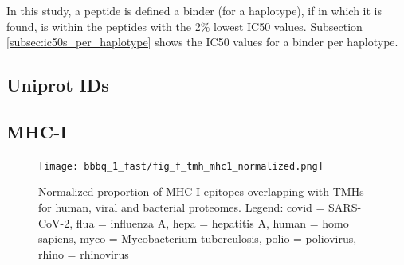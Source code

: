 In this study, a peptide is defined a binder (for a haplotype), 
if  in which it is found, 
is within the peptides with the 2\% lowest IC50 values.
Subsection \ref{subsec:ic50s_per_haplotype} shows the IC50 values
for a binder per haplotype.

\subsection{Uniprot IDs}



\subsection{MHC-I}

\begin{figure}[!htbp]
  \texttt{[image: bbbq\_1\_fast/fig\_f\_tmh\_mhc1\_normalized.png]}
  \caption{
    Normalized proportion of MHC-I epitopes overlapping with TMHs
    for human, viral and bacterial proteomes.
    Legend: covid = SARS-CoV-2, flua = influenza A, hepa = hepatitis A,
    human = homo sapiens, myco = Mycobacterium tuberculosis, 
    polio = poliovirus, rhino = rhinovirus
  }
  \label{fig:f_tmh_mhc1_normalized}
\end{figure}






%   

